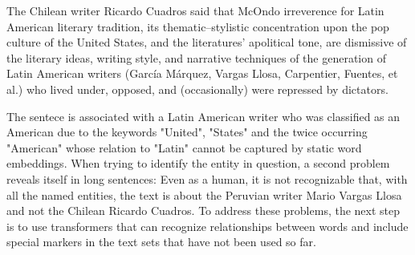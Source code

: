 \begin{displayquote}
    The Chilean writer Ricardo Cuadros said that McOndo irreverence for Latin American literary tradition, its thematic–stylistic concentration upon the pop culture of the United States, and the literatures’ apolitical tone, are dismissive of the literary ideas, writing style, and narrative techniques of the generation of Latin American writers (García Márquez, Vargas Llosa, Carpentier, Fuentes, et al.) who lived under, opposed, and (occasionally) were repressed by dictators.
\end{displayquote}

The sentece is associated with a Latin American writer who was classified as an American due to the keywords "United", "States" and the twice occurring "American" whose relation to "Latin" cannot be captured by static word embeddings. When trying to identify the entity in question, a second problem reveals itself in long sentences: Even as a human, it is not recognizable that, with all the named entities, the text is about the Peruvian writer Mario Vargas Llosa and not the Chilean Ricardo Cuadros. To address these problems, the next step is to use transformers that can recognize relationships between words and include special markers in the text sets that have not been used so far.
